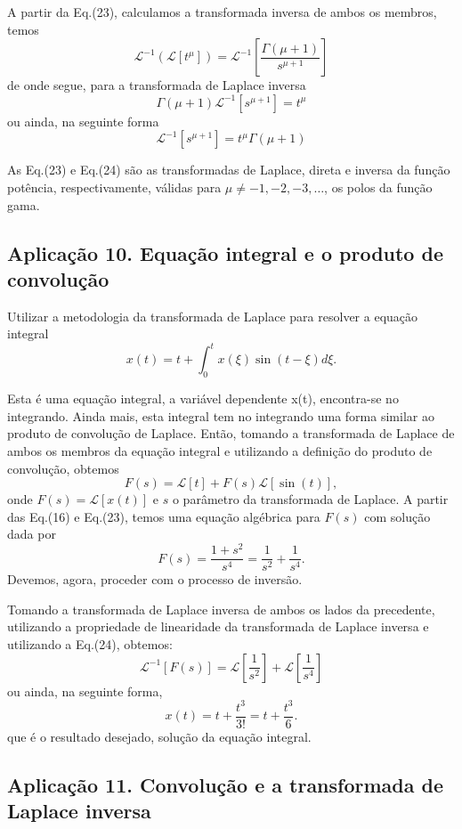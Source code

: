 A partir da Eq.(23), calculamos a transformada inversa de ambos os membros, temos
$$
\mathscr{L}^{-1} (\mathscr{L}[t^{\mu}]) = \mathscr{L}^{-1}
\left[\dfrac{\Gamma(\mu + 1)}{s^{\mu+1}}\right]
$$
de onde segue, para a transformada de Laplace inversa
$$
\Gamma(\mu + 1) \mathscr{L}^{-1} \left[s^{\mu+1}\right]
= t^{\mu}
$$
ou ainda, na seguinte forma
\begin{equation}\label{eq:aula04.24}
\mathscr{L}^{-1} \left[
s^{\mu+1}\right]
=
t^{\mu}
\Gamma(\mu + 1)
\end{equation}

As Eq.(23) e Eq.(24) são as transformadas de Laplace, direta e inversa da função potência, respectivamente, válidas para $\mu \ne -1, -2, -3, \ldots$, os polos da função gama.

\subsection{Aplicação 10. Equação integral e o produto de convolução}

Utilizar a metodologia da transformada de Laplace para resolver a equação integral
$$x(t) = t +
\int_{0}^{t}
x(\xi) \sin(t - \xi) d\xi.$$

Esta é uma equação integral, a variável dependente x(t), encontra-se no integrando. Ainda mais, esta integral tem no integrando uma forma similar ao produto de convolução de Laplace. Então, tomando a transformada de Laplace de ambos os membros da equação integral e utilizando a definição do produto de convolução, obtemos
$$F(s) = \mathscr{L}[t] + F(s)\mathscr{L}[\sin(t)],$$
onde $F(s) = \mathscr{L}[x(t)]$ e $s$ o parâmetro da transformada de Laplace. A partir das Eq.(16) e Eq.(23), temos uma equação algébrica para $F(s)$ com solução dada por
$$F(s) =
\dfrac{1 + s^{2}}{s^{4}}
=
\dfrac{1}{s^{2}}
+
\dfrac{1}{s^{4}}.$$
Devemos, agora, proceder com o processo de inversão.

Tomando a transformada de Laplace inversa de ambos os lados da precedente, utilizando a propriedade de linearidade da transformada de Laplace inversa e utilizando
a Eq.(24), obtemos:
$$
\mathscr{L}^{-1}[F(s)] = \mathscr{L}
\left[
\dfrac{1}{s^{2}}
\right]
+ \mathscr{L}
\left[
\dfrac{1}{s^{4}}
\right]$$
ou ainda, na seguinte forma,
$$x(t) = t +
\dfrac{t^{3}}{3!}
=
t +
\dfrac{t^{3}}{6}.$$
que é o resultado desejado, solução da equação integral.

\subsection{Aplicação 11. Convolução e a transformada de Laplace inversa}

